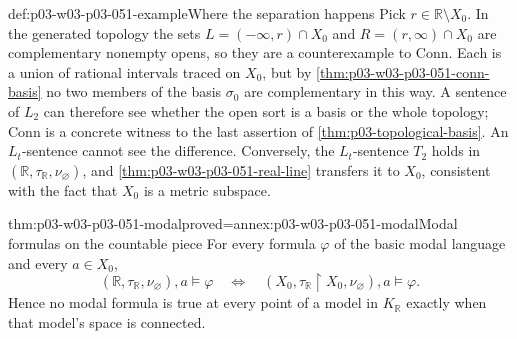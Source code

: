 \begin{hbexample}{def:p03-w03-p03-051-example}{Where the separation happens}
Pick \(r\in\mathbb R\setminus X_0\). In the generated topology the sets
\(L=(-\infty,r)\cap X_0\) and \(R=(r,\infty)\cap X_0\) are complementary
nonempty opens, so they are a counterexample to \(\mathrm{Conn}\). Each is
a union of rational intervals traced on \(X_0\), but by
\cref{thm:p03-w03-p03-051-conn-basis} no two members of the basis
\(\sigma_0\) are complementary in this way. A sentence of \(L_2\) can
therefore see whether the open sort is a basis or the whole topology;
\(\mathrm{Conn}\) is a concrete witness to the last assertion of
\cref{thm:p03-topological-basis}. An \(L_t\)-sentence cannot see the
difference. Conversely, the \(L_t\)-sentence \(T_2\) holds
in \((\mathbb R,\tau_{\mathbb R},\nu_\varnothing)\), and
\cref{thm:p03-w03-p03-051-real-line} transfers it to
\(X_0\), consistent with the fact that \(X_0\) is a metric subspace.
\end{hbexample}

\begin{hbcorollary}{thm:p03-w03-p03-051-modal}{proved=annex:p03-w03-p03-051-modal}{Modal formulas on the countable piece}
For every formula \(\varphi\) of the basic modal language and every
\(a\in X_0\),
\[
 (\mathbb R,\tau_{\mathbb R},\nu_\varnothing),a\models\varphi
 \quad\Longleftrightarrow\quad
 (X_0,\tau_{\mathbb R}\restriction X_0,\nu_\varnothing),a\models\varphi .
\]
Hence no modal formula is true at every point of a model in
\(K_{\mathbb R}\) exactly when that model's space is connected.
\end{hbcorollary}


